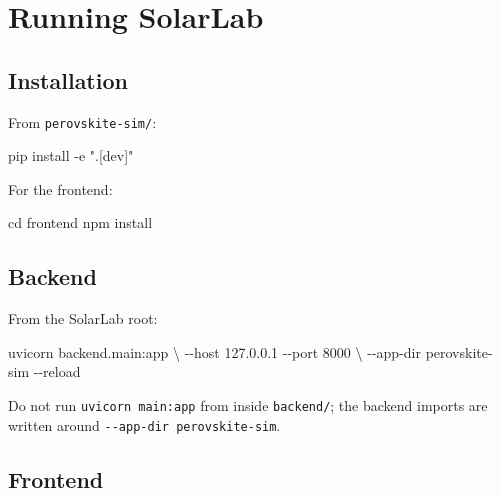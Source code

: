 \documentclass[
  11pt,
  american,
]{report}
\newenvironment{Shaded}{}{}
\newcommand{\AttributeTok}[1]{\textcolor[rgb]{0.49,0.56,0.16}{#1}}
\newcommand{\BuiltInTok}[1]{#1}
\newcommand{\DataTypeTok}[1]{\textcolor[rgb]{0.56,0.13,0.00}{#1}}
\newcommand{\ExtensionTok}[1]{#1}
\newcommand{\NormalTok}[1]{#1}
\newcommand{\StringTok}[1]{\textcolor[rgb]{0.25,0.44,0.63}{#1}}
\begin{document}
\hypertarget{running-solarlab}{%
\chapter{Running SolarLab}\label{running-solarlab}}

\hypertarget{installation}{%
\section{Installation}\label{installation}}

From \texttt{perovskite-sim/}:

\begin{Shaded}
\begin{Highlighting}[]
\ExtensionTok{pip}\NormalTok{ install }\AttributeTok{{-}e} \StringTok{".[dev]"}
\end{Highlighting}
\end{Shaded}

For the frontend:

\begin{Shaded}
\begin{Highlighting}[]
\BuiltInTok{cd}\NormalTok{ frontend}
\ExtensionTok{npm}\NormalTok{ install}
\end{Highlighting}
\end{Shaded}

\hypertarget{backend}{%
\section{Backend}\label{backend}}

From the SolarLab root:

\begin{Shaded}
\begin{Highlighting}[]
\ExtensionTok{uvicorn}\NormalTok{ backend.main:app }\DataTypeTok{\textbackslash{}}
  \AttributeTok{{-}{-}host}\NormalTok{ 127.0.0.1 }\AttributeTok{{-}{-}port}\NormalTok{ 8000 }\DataTypeTok{\textbackslash{}}
  \AttributeTok{{-}{-}app{-}dir}\NormalTok{ perovskite{-}sim }\AttributeTok{{-}{-}reload}
\end{Highlighting}
\end{Shaded}

Do not run \texttt{uvicorn\ main:app} from inside \texttt{backend/}; the
backend imports are written around \texttt{-\/-app-dir\ perovskite-sim}.

\hypertarget{frontend}{%
\section{Frontend}\label{frontend}}
\end{document}
